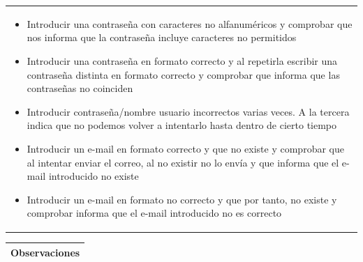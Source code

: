 \documentclass[11pt]{article}
\begin{document}
\begin{table}[H]
\begin{tabular}{p{1.028\linewidth}}
\begin{itemize}
  \item Introducir una contraseña con caracteres no alfanuméricos y comprobar que nos informa que la contraseña incluye caracteres no permitidos
  \item Introducir una contraseña en formato correcto y al repetirla escribir una contraseña distinta en formato correcto y comprobar que informa que las contraseñas no coinciden
  \item Introducir contraseña/nombre usuario incorrectos varias veces. A la tercera indica que no podemos volver a intentarlo hasta dentro de cierto tiempo
  \item Introducir un e-mail en formato correcto y que no existe y comprobar que al intentar enviar el correo, al no existir no lo envía y que informa que el e-mail introducido no existe
  \item Introducir un e-mail en formato no correcto y que por tanto, no existe y comprobar informa que el e-mail introducido no es correcto
  \end{itemize}
\end{tabular}
\begin{tabular}{p{1.028\linewidth}}
  \textbf{Observaciones}\\
  \midrule
\end{tabular}
\end{table}
\end{document}
